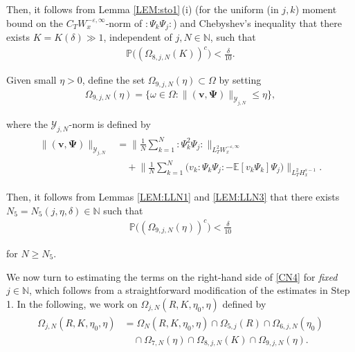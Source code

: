 \documentclass[letterpaper, 11pt,  reqno]{amsart}
\newcommand{\1}{\hspace{0.5mm}\text{I}\hspace{0.2mm}}
\newcommand{\noi}{\noindent}
\newcommand{\N}{\mathbb{N}}
\newcommand{\E}{\mathbb{E}}
\newcommand{\PP}{\mathbb{P}}
\newcommand{\eps}{\varepsilon}
\newcommand{\dl}{\delta}
\newcommand{\Y}{\mathcal{Y}}
\newcommand{\wick}[1]{:\!{#1}\!:}
\newcommand{\vv}{\mathbf{v}}
\renewcommand{\O}{\Omega}
\renewcommand{\o}{\omega}
\numberwithin{equation}{section}
\numberwithin{theorem}{section}
\begin{document}
\noi
Then, it follows from Lemma \ref{LEM:sto1}\,(i) 
(for the uniform (in $j, k$) moment bound
on the $C_T W^{-\eps, \infty}_x$-norm of $\wick{\Psi_k\Psi_j}$)
and  Chebyshev's  inequality
that 
there exists $K  = K(\dl) \gg1 $, independent of $j, N \in \N$,  such that 
\begin{align}
\PP\big( (\O_{8, j, N}(K))^c \big) < \frac \dl {10} .
\label{BDX6}
\end{align}


\noi
Given small $\eta > 0$, 
define the set 
$\O_{9, j, N}(\eta) \subset \O$ by setting 
\begin{align}
\O_{9, j, N}(\eta)
= \Big\{ \o \in \O:  
\|(\vv, \pmb \Psi) \|_{ \Y_{j, N}} \le \eta
 \Big\}, 
\label{BDX7}
\end{align}

\noi
where the $\Y_{j, N}$-norm is defined by 
\begin{align}
\begin{split}
\|(\vv, \pmb \Psi) \|_{ \Y_{j, N}}
& =  \bigg\| \frac 1N \sum_{k = 1}^N 
\wick{\Psi_k^2 \Psi_j} \bigg\|_{ L_T^2 W_x^{- \eps, \infty}}\\
& \quad 
+ \bigg\| \frac 1N \sum_{k = 1}^N \Big( v_k\! \wick{\Psi_k \Psi_j} 
- \E [ v_k\Psi_k ] \Psi_j \Big) \bigg\|_{L_T^2 H_x^{s-1}} .
\end{split}
\label{BDX2}
\end{align}


\noi
Then, 
it follows from Lemmas \ref{LEM:LLN1} and \ref{LEM:LLN3}
that there exists $N_5 = N_5(j, \eta, \dl) \in \N$ such that 
\begin{align}
\PP\big( (\O_{9, j, N}(\eta))^c \big) < \frac \dl {10}
\label{BDX9}
\end{align}

\noi
for $N \ge N_5$.




\medskip

We now turn to estimating the terms
on the right-hand side of \eqref{CN4}
for {\it fixed} $j \in \N$, 
which follows from 
a straightforward modification of the estimates in Step 1.
In the following, we work on 
$\O_{j, N} (R, K, \eta_0,\eta)$ defined by 
\begin{align}
\begin{split}
\O_{j, N}  (R, K, \eta_0, \eta)
& = \O_N  (R, K, \eta_0, \eta)\cap 
\O_{5, j}(R)\cap 
\O_{6, j, N}(\eta_0)\\
& \quad \cap 
 \O_{7, N}(\eta) \cap \O_{8, j, N}(K) \cap \O_{9, j, N}(\eta).
\end{split}
\label{BDX10}
\end{align}
\end{document}

